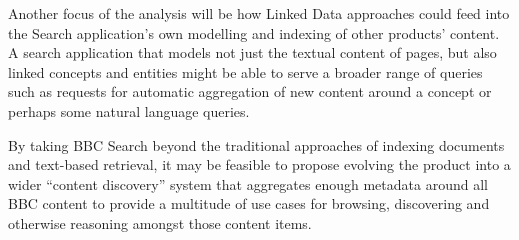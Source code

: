 \documentclass[10pt,a4paper]{article}
\begin{document}
Another focus of the analysis will be how Linked Data approaches
could feed into the Search application's own modelling and indexing
of other products' content. A search application that models not
just the textual content of pages, but also linked concepts and
entities might be able to serve a broader range of queries
such as requests for automatic aggregation of new content around
a concept or perhaps some natural language queries.

By taking BBC Search beyond the traditional approaches of indexing
documents and text-based retrieval, it may be feasible to propose
evolving the product into a wider ``content discovery'' system
that aggregates enough metadata around all BBC content to provide
a multitude of use cases for browsing, discovering and otherwise
reasoning amongst those content items.
\end{document}
